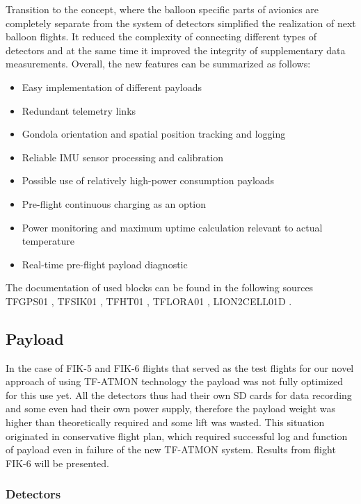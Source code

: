 \documentclass{Rpd}
\begin{document}
Transition to the concept, where the balloon specific parts of avionics are completely separate from the system of detectors simplified the realization of next balloon flights. It reduced the complexity of connecting different types of detectors and at the same time it improved the integrity of supplementary data measurements. Overall, the new features can be summarized as follows:

\begin{itemize}
\item Easy implementation of different payloads
\item Redundant telemetry links
\item Gondola orientation and spatial position tracking and logging
\item Reliable IMU sensor processing and calibration
\item Possible use of relatively high-power consumption payloads
\item Pre-flight continuous charging as an option
\item Power monitoring and maximum uptime calculation relevant to actual temperature
\item Real-time pre-flight payload diagnostic
\end{itemize}

The documentation of used blocks can be found in the following sources TFGPS01 \cite{TFGPS01}, TFSIK01 \cite{TFSIK01}, TFHT01 \cite{TFHT01}, TFLORA01 \cite{TFLORA01}, LION2CELL01D \cite{LION2CELL01D}.


\subsection{Payload}

In the case of FIK-5 and FIK-6 flights that served as the test flights for our novel approach of using TF-ATMON technology the payload was not fully optimized for this use yet. All the detectors thus had their own SD cards for data recording and some even had their own power supply, therefore the payload weight was higher than theoretically required and some lift was wasted. This situation originated in conservative flight plan, which required successful log and function of payload even in failure of the new TF-ATMON system. Results from flight FIK-6 will be presented.

\subsubsection{Detectors}
\end{document}
